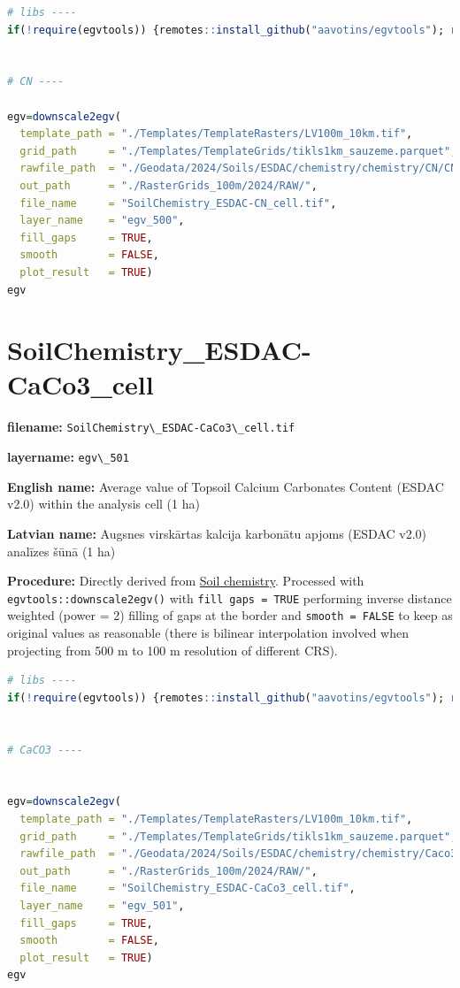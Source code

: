 \documentclass[
]{book}
\newcommand{\passthrough}[1]{#1}
\begin{document}
\begin{lstlisting}[language=R]
# libs ----
if(!require(egvtools)) {remotes::install_github("aavotins/egvtools"); require(egvtools)}


# CN ----

egv=downscale2egv(
  template_path = "./Templates/TemplateRasters/LV100m_10km.tif",
  grid_path     = "./Templates/TemplateGrids/tikls1km_sauzeme.parquet",
  rawfile_path  = "./Geodata/2024/Soils/ESDAC/chemistry/chemistry/CN/CN.tif",
  out_path      = "./RasterGrids_100m/2024/RAW/",
  file_name     = "SoilChemistry_ESDAC-CN_cell.tif",
  layer_name    = "egv_500",
  fill_gaps     = TRUE,
  smooth        = FALSE,
  plot_result   = TRUE)
egv
\end{lstlisting}

\section{SoilChemistry\_ESDAC-CaCo3\_cell}\label{ch06.501}

\textbf{filename:} \passthrough{\lstinline!SoilChemistry\_ESDAC-CaCo3\_cell.tif!}

\textbf{layername:} \passthrough{\lstinline!egv\_501!}

\textbf{English name:} Average value of Topsoil Calcium Carbonates Content (ESDAC v2.0) within the analysis cell (1 ha)

\textbf{Latvian name:} Augsnes virskārtas kalcija karbonātu apjoms (ESDAC v2.0) analīzes šūnā (1 ha)

\textbf{Procedure:} Directly derived from \hyperref[Ch04.07.01]{Soil chemistry}. Processed
with \passthrough{\lstinline!egvtools::downscale2egv()!} with \passthrough{\lstinline!fill gaps = TRUE!} performing inverse
distance weighted (power = 2) filling of gaps at the border and \passthrough{\lstinline!smooth = FALSE!}
to keep as original values as reasonable (there is bilinear interpolation
involved when projecting from 500 m to 100 m resolution of different CRS).

\begin{lstlisting}[language=R]
# libs ----
if(!require(egvtools)) {remotes::install_github("aavotins/egvtools"); require(egvtools)}


# CaCO3 ----


egv=downscale2egv(
  template_path = "./Templates/TemplateRasters/LV100m_10km.tif",
  grid_path     = "./Templates/TemplateGrids/tikls1km_sauzeme.parquet",
  rawfile_path  = "./Geodata/2024/Soils/ESDAC/chemistry/chemistry/Caco3/CaCO3.tif",
  out_path      = "./RasterGrids_100m/2024/RAW/",
  file_name     = "SoilChemistry_ESDAC-CaCo3_cell.tif",
  layer_name    = "egv_501",
  fill_gaps     = TRUE,
  smooth        = FALSE,
  plot_result   = TRUE)
egv
\end{lstlisting}
\end{document}

